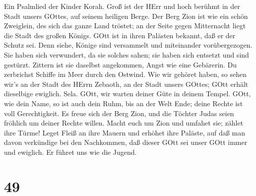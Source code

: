  Ein Psalmlied der Kinder Korah.  Groß ist der
HErr und hoch berühmt in der Stadt unsers GOttes, auf seinem heiligen
Berge.  Der Berg Zion ist wie ein schön Zweiglein, des sich
das ganze Land tröstet; an der Seite gegen Mitternacht liegt die Stadt
des großen Königs.  GOtt ist in ihren Palästen bekannt, daß
er der Schutz sei.  Denn siehe, Könige sind versammelt und
miteinander vorübergezogen.  Sie haben sich verwundert, da
sie solches sahen; sie haben sich entsetzt und sind gestürzt.
 Zittern ist sie daselbst angekommen, Angst wie eine
Gebärerin.  Du zerbrichst Schiffe im Meer durch den Ostwind.
 Wie wir gehöret haben, so sehen wir's an der Stadt des
HErrn Zebaoth, an der Stadt unsers GOttes; GOtt erhält dieselbige
ewiglich. Sela.  GOtt, wir warten deiner Güte in deinem
Tempel.  GOtt, wie dein Name, so ist auch dein Ruhm, bis an
der Welt Ende; deine Rechte ist voll Gerechtigkeit.  Es
freue sich der Berg Zion, und die Töchter Judas seien fröhlich um deiner
Rechte willen.  Macht euch um Zion und umfahet sie; zählet
ihre Türme!  Leget Fleiß an ihre Mauern und erhöhet ihre
Paläste, auf daß man davon verkündige bei den Nachkommen, 
daß dieser GOtt sei unser GOtt immer und ewiglich. Er führet uns wie die
Jugend.

\hypertarget{section-48}{%
\section{49}\label{section-48}}

